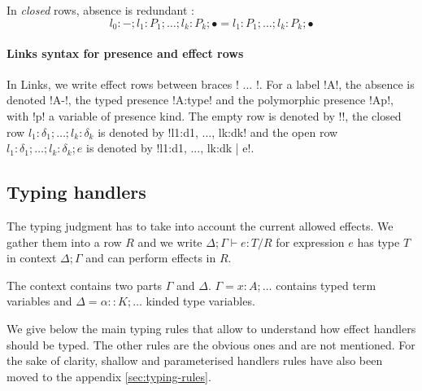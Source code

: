 \documentclass[10pt, nonacm=true, language=french, language=english]{acmart}
\begin{document}
\begin{rem}
  In \emph{closed} rows, absence is redundant :
  $$ l_{0}:- ; l_{1}:P_{1} ; \dots ; l_{k}:P_{k} ; \bullet = l_{1}:P_{1} ; \dots ; l_{k} : P_{k} ; \bullet $$
\end{rem}

\paragraph{Links syntax for presence and effect rows}
In Links, we write effect rows between braces !{ ... }!. For a label !A!, the absence is denoted !A-!, the typed presence !A:type! and the polymorphic presence !A{p}!, with !p! a variable of presence kind. The empty row is denoted by !{}!, the closed row $l_{1}:\delta_{1}; \dots; l_{k}:\delta_{k}$ is denoted by !{l1:d1, ..., lk:dk}! and the open row $l_{1}:\delta_{1}; \dots; l_{k}:\delta_{k}; e$ is denoted by !{l1:d1, ..., lk:dk | e}!.

\subsection{Typing handlers}
\label{sec:typing-handlers}

The typing judgment has to take into account the current allowed effects. We gather them into a row $R$ and we write $\Delta;\Gamma \vdash e : T / R$ for expression $e$ has type $T$ in context $\Delta;\Gamma$ and can perform effects in $R$.

\begin{rem}
  The context contains two parts $\Gamma$ and $\Delta$. $\Gamma = x : A ; \dots$ contains typed term variables and $\Delta = \alpha :: K; \dots$ kinded type variables.
\end{rem}

We give below the main typing rules that allow to understand how effect handlers should be typed. The other rules are the obvious ones and are not mentioned. For the sake of clarity, shallow and parameterised handlers rules have also been moved to the appendix \ref{sec:typing-rules}.
\end{document}
